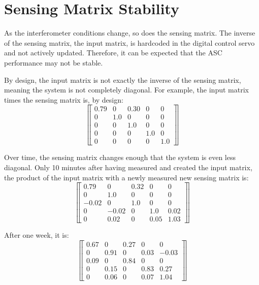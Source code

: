 



\section{Sensing Matrix Stability}
As the interferometer conditions change, so does the sensing
matrix. The inverse of the sensing matrix, the input matrix, is
hardcoded in the digital control servo and not actively
updated. Therefore, it can be expected that the ASC performance may
not be stable. 

By design, the input matrix is not exactly the inverse of the sensing
matrix, meaning the system is not completely diagonal. For example,
the input matrix times the sensing matrix is, by design:
\begin{equation}
\left\llbracket \begin{array}{ccccc}
0.79 & 0 & 0.30 & 0 & 0 \\
0 & 1.0 & 0 & 0 & 0 \\
0 & 0 & 1.0 & 0 & 0 \\
0 & 0 & 0 & 1.0 & 0 \\
0 & 0 & 0 & 0 & 1.0 
\end{array} \right\rrbracket
\end{equation}

Over time, the sensing matrix changes enough that the system is even less 
diagonal. Only 10 minutes after having measured and created the input
matrix, the product of the input matrix with a newly measured new
sensing matrix is: 
\begin{equation}
\left\llbracket \begin{array}{ccccc}
0.79 & 0 & 0.32 & 0 & 0 \\
0 & 1.0 & 0 & 0 & 0 \\
-0.02 & 0 & 1.0 & 0 & 0 \\
0 & -0.02 & 0 & 1.0 & 0.02 \\
0 & 0.02 & 0 & 0.05 & 1.03 
\end{array} \right\rrbracket
\end{equation}

After one week, it is:
\begin{equation}
\left\llbracket \begin{array}{ccccc}
0.67 & 0 & 0.27 & 0 & 0 \\
0 & 0.91 & 0 & 0.03 & -0.03 \\
0.09 & 0 & 0.84 & 0 & 0 \\
0 & 0.15 & 0 & 0.83 & 0.27 \\
0 & 0.06 & 0 & 0.07 & 1.04 
\end{array} \right\rrbracket
\end{equation}

